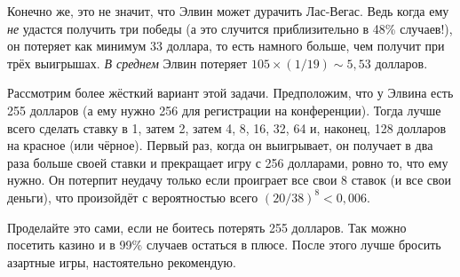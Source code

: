 Конечно же, это не значит, что Элвин может дурачить Лас-Вегас.
Ведь когда ему \emph{не} удастся получить три победы (а это случится приблизительно в 48\% случаев!), он потеряет как минимум 33 доллара, то есть намного больше, чем получит при трёх выигрышах.
\emph{В среднем} Элвин потеряет $105 \times (1/19) \sim 5{,}53$ долларов.

Рассмотрим более жёсткий вариант этой задачи.
Предположим, что у Элвина есть 255 долларов (а ему нужно 256 для регистрации на конференции).
Тогда лучше всего сделать ставку в 1, затем 2, затем 4, 8, 16, 32, 64 и, наконец, 128 долларов на красное (или чёрное).
Первый раз, когда он выигрывает, он получает в два раза больше своей ставки и прекращает игру с 256 долларами, ровно то, что ему нужно.
Он потерпит неудачу только если проиграет все свои $8$ ставок (и все свои деньги), что произойдёт с вероятностью всего $(20/38)^8 < 0{,}006$.

Проделайте это сами, если не боитесь потерять 255 долларов.
Так можно посетить казино и в 99\% случаев остаться в плюсе.
После этого лучше бросить азартные игры, настоятельно рекомендую.
